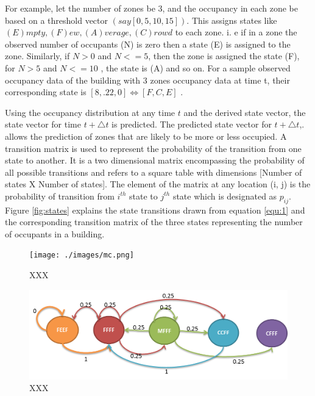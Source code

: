 For example, let the number of zones be 3, and the occupancy in each zone be based on a threshold vector $(say [0, 5, 10, 15])$.  This assigns states like \\
${(E)mpty,  (F)ew,  (A)verage,  (C)rowd} $ to each zone.  i. e if in a zone the observed number of occupants (N) is zero then a state (E) is assigned to the zone.  Similarly, if $N > 0 $ and $N <= 5$, then the zone is assigned the state (F), for $N > 5 $ and $N <= 10$ ,  the state is (A) and so on.  For a sample observed occupancy data of the building with 3 zones occupancy data at time t, their corresponding state is $[8,.22, 0] \Leftrightarrow [F,  C,  E]$ .

Using the occupancy distribution at any time ${t}$ and the derived state vector, the state vector for time ${t + \triangle t}$  is predicted.  The predicted state vector for ${t + \triangle t} $,. allows  the prediction of zones that are likely to be more or less occupied.  A transition matrix is used to represent the probability of the transition from one state to another.  It is a two dimensional matrix encompassing the probability of all possible transitions  and refers to a square table with dimensions [Number of states X Number of states].   The element of the matrix at any location (i, j) is the probability of transition from $i^{th}$ state to $j^{th}$ state which is designated as $p _ {ij}$.   Figure \ref{fig:states} explains the state transitions drawn from equation \ref{equ:1} and the corresponding transition matrix of the three states representing the number of occupants in a building.

\begin{figure}[!ht]
  \centering
 	  	\texttt{[image: ./images/mc.png]}
  \caption{XXX}
\end{figure}

\begin{figure}[!ht]
  \centering
 	  	\includegraphics[width=0.9\columnwidth]{./images/mcc.png}
  \caption{XXX}
\end{figure}

